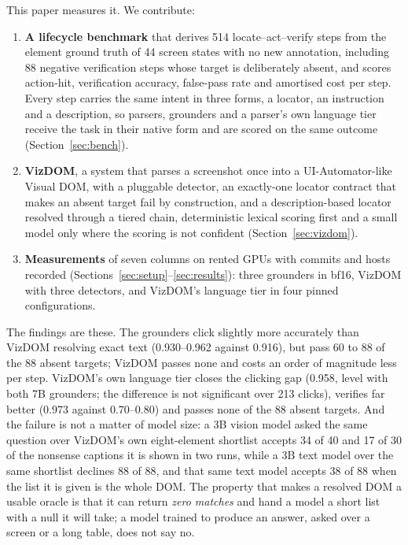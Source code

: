 \documentclass[conference]{IEEEtran}
\begin{document}
This paper measures it. We contribute:
\begin{enumerate}
  \item \textbf{A lifecycle benchmark} that derives 514 locate--act--verify steps from the element ground truth of 44 screen states with no new annotation, including 88 negative verification steps whose target is deliberately absent, and scores action-hit, verification accuracy, false-pass rate and amortised cost per step. Every step carries the same intent in three forms, a locator, an instruction and a description, so parsers, grounders and a parser's own language tier receive the task in their native form and are scored on the same outcome (Section~\ref{sec:bench}).
  \item \textbf{VizDOM}, a system that parses a screenshot once into a UI-Automator-like Visual DOM, with a pluggable detector, an exactly-one locator contract that makes an absent target fail by construction, and a description-based locator resolved through a tiered chain, deterministic lexical scoring first and a small model only where the scoring is not confident (Section~\ref{sec:vizdom}).
  \item \textbf{Measurements} of seven columns on rented GPUs with commits and hosts recorded (Sections~\ref{sec:setup}--\ref{sec:results}): three grounders in bf16, VizDOM with three detectors, and VizDOM's language tier in four pinned configurations.
\end{enumerate}

The findings are these. The grounders click slightly more accurately than VizDOM resolving exact text (0.930--0.962 against 0.916), but pass 60 to 88 of the 88 absent targets; VizDOM passes none and costs an order of magnitude less per step. VizDOM's own language tier closes the clicking gap (0.958, level with both 7B grounders; the difference is not significant over 213 clicks), verifies far better (0.973 against 0.70--0.80) and passes none of the 88 absent targets. And the failure is not a matter of model size: a 3B vision model asked the same question over VizDOM's own eight-element shortlist accepts 34 of 40 and 17 of 30 of the nonsense captions it is shown in two runs, while a 3B text model over the same shortlist declines 88 of 88, and that same text model accepts 38 of 88 when the list it is given is the whole DOM. The property that makes a resolved DOM a usable oracle is that it can return \emph{zero matches} and hand a model a short list with a null it will take; a model trained to produce an answer, asked over a screen or a long table, does not say no.
\end{document}
